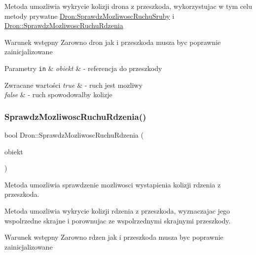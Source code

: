 Metoda umozliwia wykrycie kolizji drona z przeszkoda, wykorzystujac w tym celu metody prywatne \hyperlink{}{Dron\+:\+Sprawdz\+Mozliwosc\+Ruchu\+Sruby} i \hyperlink{classDron_a4cff7a2c46fe43e32df58c8245d9d0d3}{Dron\+::\+Sprawdz\+Mozliwosc\+Ruchu\+Rdzenia}

\begin{DoxyPrecond}{Warunek wstępny}
Zarowno dron jak i przeszkoda musza byc poprawnie zainicjalizowane 
\end{DoxyPrecond}

\begin{DoxyParams}[1]{Parametry}
\mbox{\tt in}  & {\em obiekt} & -\/ referencja do przeszkody \\
\hline
\end{DoxyParams}

\begin{DoxyRetVals}{Zwracane wartości}
{\em true} & -\/ ruch jest mozliwy \\
\hline
{\em false} & -\/ ruch spowodowalby kolizje \\
\hline
\end{DoxyRetVals}
\mbox{\label{classDron_a4cff7a2c46fe43e32df58c8245d9d0d3}} 
\subsubsection{\texorpdfstring{Sprawdz\+Mozliwosc\+Ruchu\+Rdzenia()}{SprawdzMozliwoscRuchuRdzenia()}}
{\footnotesize\ttfamily bool Dron\+::\+Sprawdz\+Mozliwosc\+Ruchu\+Rdzenia (\begin{DoxyParamCaption}\item[{\hyperlink{classObiektSceny}{Obiekt\+Sceny} \&}]{obiekt }\end{DoxyParamCaption})\hspace{0.3cm}{\ttfamily [private]}}



Metoda umozliwia sprawdzenie mozliwosci wystapienia kolizji rdzenia z przeszkoda. 

Metoda umozliwia wykrycie kolizji rdzenia z przeszkoda, wyznaczajac jego wspolrzedne skrajne i porownujac ze wspolrzednymi skrajnymi przeszkody.

\begin{DoxyPrecond}{Warunek wstępny}
Zarowno rdzen jak i przeszkoda musza byc poprawnie zainicjalizowane 
\end{DoxyPrecond}

